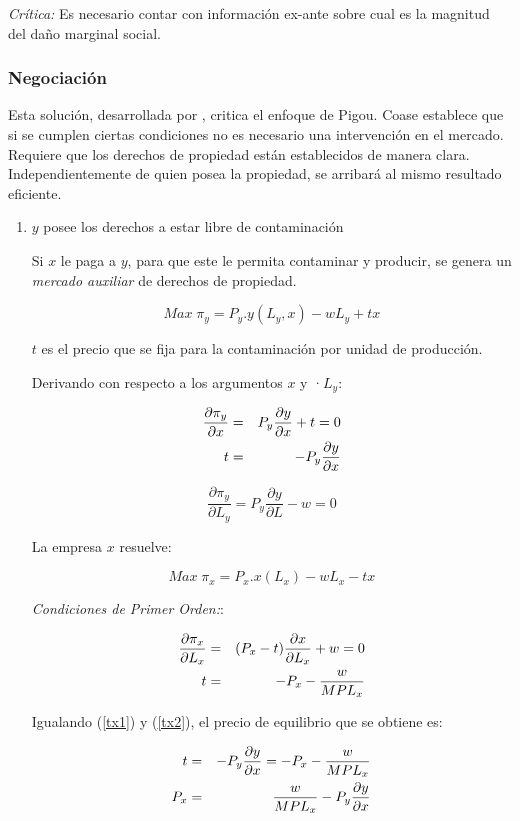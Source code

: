 \emph{Crítica:} Es necesario contar con información ex-ante sobre
cual es la magnitud del daño marginal social.

\subsubsection{Negociación}
Esta solución, desarrollada por \citet{coase}, critica el enfoque de
Pigou. Coase establece que si se cumplen ciertas condiciones no es
necesario una intervención en el mercado. Requiere que los derechos
de propiedad están establecidos de manera clara. Independientemente
de quien posea la propiedad, se arribará al mismo resultado eficiente.

\begin{enumerate}
\item $y$ posee los derechos a estar libre de contaminación
\label{casoi}

Si $x$ le paga a $y$, para que este le permita contaminar y
producir, se genera un \emph{mercado auxiliar} de derechos de
propiedad.

$$Max \; \pi_y=P_y. y(L_y,x)-wL_y+tx$$

$t$ es el precio que se fija para la contaminación por unidad de
producción.

Derivando con respecto a los argumentos $x$ y ·$L_y$:

\begin{eqnarray}
\frac{\partial \pi_y}{\partial x} &=& P_y \frac{\partial y}{\partial
x}+t=0 \nonumber \\
t & = & -P_y \frac{\partial y}{\partial x} \label{tx1}
\end{eqnarray}

$$\frac{\partial\pi_y}{\partial L_y}=P_y\frac{\partial y}{\partial
L}-w=0$$

La empresa $x$ resuelve:

$$Max \; \pi_x=P_x. x(L_x)-wL_x-tx$$

\emph{Condiciones de Primer Orden:}:

\begin{eqnarray}
\frac{\partial \pi_x}{\partial L_x} &=& (P_x-t) \frac{\partial
x}{\partial L_x}+w=0 \nonumber \\
t & = & -P_x - \frac{w}{MPL_x} \label{tx2}
\end{eqnarray}


Igualando (\ref{tx1}) y (\ref{tx2}), el precio de equilibrio que se obtiene es:

\begin{eqnarray}
t & = & -P_y \frac{\partial y}{\partial x} = -P_x -
\frac{w}{MPL_x}  \nonumber \\
P_x&=&\frac{w}{MPL_x}-P_y \frac{\partial y}{\partial x}
\end{eqnarray}


\end{enumerate}

